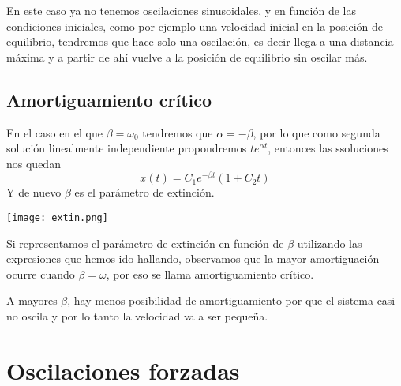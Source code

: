 En este caso ya no tenemos oscilaciones sinusoidales, y en función de las condiciones iniciales, como por ejemplo una velocidad inicial en la posición de equilibrio, tendremos que hace solo una oscilación, es decir llega a una distancia máxima y a partir de ahí vuelve a la posición de equilibrio sin oscilar más.
\subsection{Amortiguamiento crítico}
En el caso en el que $\beta = \omega_0$ tendremos que $\alpha = -\beta$, por lo que como segunda solución linealmente independiente propondremos $te^{\alpha t}$, entonces las ssoluciones nos quedan
\begin{equation} \label{6.1.1}
    x(t) = C_1 e^{-\beta t}(1+C_2t)
\end{equation}
Y de nuevo $\beta$ es el parámetro de extinción.

\begin{center}
    \texttt{[image: extin.png]}    
\end{center}

Si representamos el parámetro de extinción en función de $\beta$ utilizando las expresiones que hemos ido hallando, observamos que la mayor amortiguación ocurre cuando $\beta = \omega$, por eso se llama amortiguamiento crítico.

A mayores $\beta$, hay menos posibilidad de amortiguamiento por que el sistema casi no oscila y por lo tanto la velocidad va a ser pequeña.

\section{Oscilaciones forzadas}